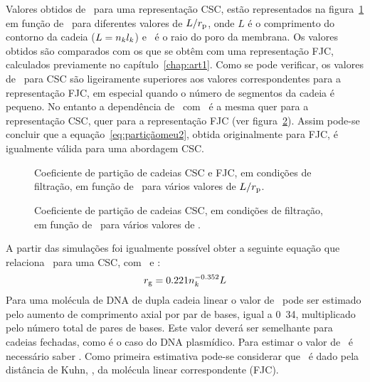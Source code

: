Valores obtidos de \particao\, para uma representação CSC, estão representados na figura~\ref{fig:1aart2} em função de \numsegmento\ para diferentes valores de $L/r_{\mathrm{p}}$, onde $L$ é o comprimento do contorno da cadeia ($L=n_{k}l_{k}$) e \raioporo\ é o raio do poro da membrana. Os valores obtidos são comparados com os que se obtêm com uma representação FJC, calculados previamente no capítulo~\ref{chap:art1}. Como se pode verificar, os valores de \particao\ para CSC são ligeiramente superiores aos valores correspondentes para a representação FJC, em especial quando o número de segmentos da cadeia é pequeno. No entanto a dependência de \particao\ com \raiogiracao\ é a mesma quer para a representação CSC, quer para a representação FJC (ver figura~\ref{fig:1bart2}). Assim pode-se concluir que a equação~\ref{eq:partiçãomeu2}, obtida originalmente para FJC, é igualmente válida para uma abordagem CSC.
%
\begin{figure}
	\centering 
	\setlength\figureheight{6cm} 
	\setlength\figurewidth{6cm}
	
	\caption[Coeficiente de partição de cadeias CSC e FJC]{Coeficiente de partição de cadeias CSC e FJC, em condições de filtração, em função de \numsegmento\ para vários valores de $L/r_{\mathrm{p}}$.}
	\label{fig:1aart2}
\end{figure}  
\begin{figure}
	\centering
	\setlength\figureheight{6cm} 
	\setlength\figurewidth{6cm}
	
	\caption[Coeficiente de partição de cadeias CSC em função de \lambdag]{Coeficiente de partição de cadeias CSC, em condições de filtração, em função de \lambdag\ para vários valores de \numsegmento.}
	\label{fig:1bart2}
\end{figure}  
A partir das simulações foi igualmente possível obter a seguinte equação que relaciona \raiogiracao\, para uma CSC, com \numsegmento\ e \contorno:
%
%
%
\begin{equation}
\label{eq:rgnkLart2}
r_{\mathrm{g}}=0.221n_{k}^{-0.352}L
\end{equation}
Para uma molécula de DNA de dupla cadeia linear o valor de \contorno\ pode ser estimado pelo aumento de comprimento axial por par de bases, igual a \unit{0.34}{\nano\meter}, multiplicado pelo número total de pares de bases.
Este valor deverá ser semelhante para cadeias fechadas, como é o caso do DNA plasmídico. Para estimar o valor de \numsegmento\ é necessário saber \comsegmento. Como primeira estimativa pode-se considerar que \comsegmento\ é dado pela distância de Kuhn, \kuhn, da molécula linear correspondente (FJC).
